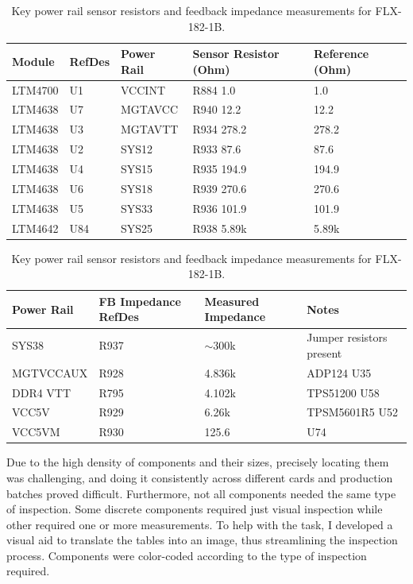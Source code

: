 \begin{table}[H]
\centering
\caption[Reference value of resistors]{Key power rail sensor resistors and feedback impedance measurements for FLX-182-1B.}
\label{tab:pcb-rail-measurements}
\begin{tabular}{|l|l|l|l|l|}
\hline
\textbf{Module} & \textbf{RefDes} & \textbf{Power Rail} & \textbf{Sensor Resistor (Ohm)} & \textbf{Reference (Ohm)} \\
\hline
LTM4700 & U1  & VCCINT   & R884 1.0    & 1.0 \\
LTM4638 & U7  & MGTAVCC  & R940 12.2   & 12.2 \\
LTM4638 & U3  & MGTAVTT  & R934 278.2  & 278.2 \\
LTM4638 & U2  & SYS12    & R933 87.6   & 87.6 \\
LTM4638 & U4  & SYS15    & R935 194.9  & 194.9 \\
LTM4638 & U6  & SYS18    & R939 270.6  & 270.6 \\
LTM4638 & U5  & SYS33    & R936 101.9  & 101.9 \\
LTM4642 & U84 & SYS25    & R938 5.89k  & 5.89k \\
\hline
\end{tabular}

\vspace{1em}

\begin{tabular}{|l|l|l|l|}
\hline
\textbf{Power Rail} & \textbf{FB Impedance RefDes} & \textbf{Measured Impedance} & \textbf{Notes} \\
\hline
SYS38        & R937  & $\sim$300k    & Jumper resistors present \\
MGTVCCAUX    & R928  & 4.836k        & ADP124 U35 \\
DDR4 VTT     & R795  & 4.102k        & TPS51200 U58 \\
VCC5V        & R929  & 6.26k         & TPSM5601R5 U52 \\
VCC5VM       & R930  & 125.6         & U74 \\
\hline
\end{tabular}
\end{table}

Due to the high density of components and their sizes, precisely locating them was challenging, and doing it consistently across different cards and production batches proved difficult. Furthermore, not all components needed the same type of inspection. Some discrete components required just visual inspection while other required one or more measurements. To help with the task, I developed a visual aid to translate the tables into an image, thus streamlining the inspection process. Components were color-coded according to the type of inspection required.

